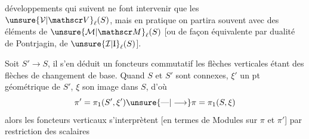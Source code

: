 développements qui suivent ne font intervenir que les $\unsure{\mathcal V|\mathscr V}_\ell(S)$, mais en pratique on partira souvent avec des éléments de $\unsure{\mathcal M|\mathscr M}_\ell(S)$ [ou de façon équivalente par dualité de Pontrjagin, de $\unsure{\mathcal I|\mathrm I}_\ell(S)$].

Soit $S'\longrightarrow S$, il s'en déduit un  foncteurs  commutatif
les flèches verticales étant des flèches de changement de base. Quand $S$ et $S'$ sont connexes, $\xi'$ un pt géométrique de $S'$, $\xi$ son image dans $S$, d'où
\[
\pi'=\pi_1(S',\xi')\unsure{\text{---}|\longrightarrow}\pi=\pi_1(S,\xi)
\]
alors les foncteurs verticaux s'interprètent [en termes de  Modules sur $\pi$ et $\pi'$] par restriction des scalaires
